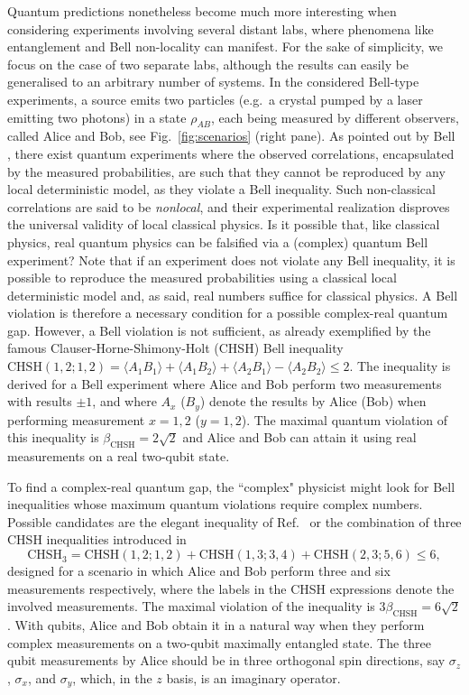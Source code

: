 \documentclass[onecolumn,prx,amsmath,amssymb,12pt]{revtex4-2}
\begin{document}
Quantum predictions nonetheless become much more interesting when considering experiments involving several distant labs, where phenomena like entanglement \cite{schroedinger} and Bell non-locality \cite{Bell1964} can manifest. For the sake of simplicity, we focus on the case of two separate labs, although the results can easily be generalised to an arbitrary number of systems. In the considered Bell-type experiments, a source emits two particles (e.g.~a crystal pumped by a laser emitting two photons) in a state $\rho_{AB}$, each being measured by different observers, called Alice and Bob, see Fig.~\ref{fig:scenarios} (right pane). As pointed out by Bell \cite{Bell1964}, there exist quantum experiments where the observed correlations, encapsulated by the measured probabilities, %
are such that they cannot be reproduced by any local deterministic model, as they violate a Bell inequality. Such non-classical correlations are said to be \emph{nonlocal}, and their experimental realization disproves the universal validity of local classical physics. 
Is it possible that, like classical physics, real quantum physics can be falsified via a (complex) quantum Bell experiment? Note that if an experiment does not violate any Bell inequality, it is possible to reproduce the measured probabilities using a classical local deterministic model and, as said, real numbers suffice for classical physics. A Bell violation is therefore a necessary condition for a possible complex-real quantum gap. However, a Bell violation is not sufficient, as already exemplified by the famous Clauser-Horne-Shimony-Holt (CHSH) Bell inequality~\cite{chsh} $\text{CHSH}(1,2;1,2)=\langle A_1B_1\rangle +\langle A_1B_2\rangle+\langle A_2B_1\rangle-\langle A_2B_2\rangle\leq 2$. The inequality is derived for a Bell experiment where Alice and Bob perform two measurements with results $\pm 1$, and where $A_x$ ($B_y$) denote the results by Alice (Bob) when performing measurement $x=1,2$ ($y=1,2$). The maximal quantum violation of this inequality is $\beta_\text{CHSH}=2\sqrt 2$ and Alice and Bob can attain it using real measurements on a real two-qubit state.

To find a complex-real quantum gap, the ``complex" physicist might look for  Bell inequalities whose maximum quantum violations require complex numbers. Possible candidates are the elegant inequality of Ref.~\cite{elegant} or the combination of three CHSH inequalities introduced in~\cite{optimal_ent_bit,self_testing}
\begin{equation}
\label{eq:chsh3}
\text{CHSH}_3=\text{CHSH}(1,2;1,2)+\text{CHSH}(1,3;3,4)+\text{CHSH}(2,3;5,6)\leq 6,
\end{equation}
designed for a scenario in which Alice and Bob perform three and six measurements respectively, where the labels in the CHSH expressions denote the involved measurements. The maximal violation of the inequality is $3\beta_\text{CHSH}=6\sqrt 2$. With qubits, Alice and Bob obtain it in a natural way when they perform complex measurements on a two-qubit maximally entangled state. The three qubit measurements by Alice should be in three orthogonal spin directions, say $\sigma_z$, $\sigma_x$, and $\sigma_y$, which, in the $z$ basis, is an imaginary operator. 
\end{document}
